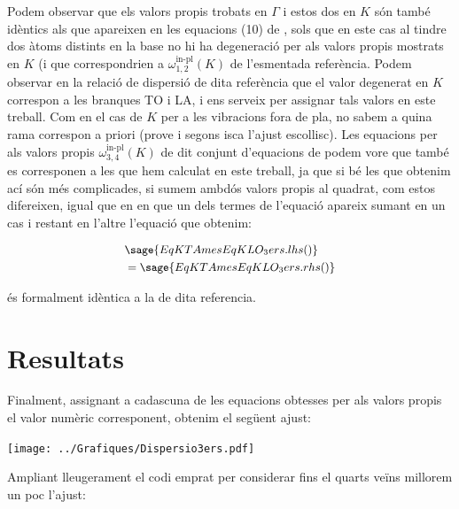 \documentclass[12pt]{article} %
\begin{document}
Podem observar que els valors propis trobats en $\Gamma$ i estos dos en $K$ són també idèntics als que apareixen en les equacions (10) de \cite{falkovsky08_symmet_const_phonon_disper_graph}, sols que en este cas al tindre dos àtoms distints en la base no hi ha degeneració per als valors propis mostrats en $K$ (i que correspondrien a $\omega_{1,2}^\text{in-pl}(K)$ de l'esmentada referència. Podem observar en la relació de dispersió de dita referència que el valor degenerat en $K$ correspon a les branques TO i LA, i ens serveix per assignar tals valors en este treball. Com en el cas de $K$ per a les vibracions fora de pla, no sabem a quina rama correspon a priori (prove i segons isca l'ajust escollisc). Les equacions per als valors propis $\omega_{3,4}^\text{in-pl}(K)$ de dit conjunt d'equacions de \cite{falkovsky08_symmet_const_phonon_disper_graph} podem vore que també es corresponen a les que hem calculat en este treball, ja que si bé les que obtenim ací són més complicades, si sumem ambdós valors propis al quadrat, com estos difereixen, igual que en \cite{falkovsky08_symmet_const_phonon_disper_graph} en que un dels termes de l'equació apareix sumant en un cas i restant en l'altre l'equació que obtenim:

\begin{equation}\small{\begin{split}
\label{sumaktaiklo3ers}
 &\sage{EqKTAmesEqKLO_3ers.lhs()}\\
 &=\sage{EqKTAmesEqKLO_3ers.rhs()}
 \end{split}}
\end{equation}

és formalment idèntica a la de dita referencia.

\section{Resultats}

Finalment, assignant a cadascuna de les equacions obtesses per als valors propis el valor numèric corresponent, obtenim el següent ajust:

\begin{center}
\texttt{[image: ../Grafiques/Dispersio3ers.pdf]}
\end{center}

Ampliant lleugerament el codi emprat per considerar fins el quarts veïns millorem un poc l'ajust:
\end{document}
